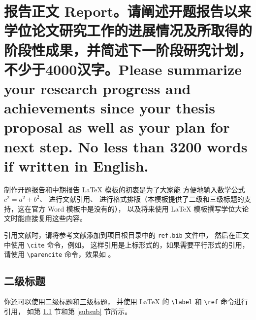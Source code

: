 \documentclass[a4paper,zihao=-4,AutoFakeBold]{ctexart}
\begin{document}
\kaishu
\linespread{1.75}\selectfont

\makeatletter
{}
\makeatother




\section{报告正文 Report。\mdseries 请阐述开题报告以来学位论文研究工作的进展情况及所取得的阶段性成果，并简述下一阶段研究计划，不少于4000汉字。Please summarize your research progress and achievements since your thesis proposal as well as your plan for next step. No less than 3200 words if written in English.}

制作开题报告和中期报告 \LaTeX{} 模板的初衷是为了大家能
方便地输入数学公式 $c^2 = a^2 + b^2$、
进行文献引用\cite{ZJSD}、
进行格式排版（本模板提供了二级和三级标题的支持，这在官方 Word 模板中是没有的），
以及将来使用 \LaTeX{} 模板撰写学位大论文时能直接复用这些内容。


引用文献时，请将参考文献添加到项目根目录中的 \texttt{ref.bib} 文件中，
然后在正文中使用 \verb|\cite| 命令，例如\cite{SPDZ}。
这样引用是上标形式的，如果需要平行形式的引用，请使用
\verb|\parencite| 命令，效果如 \parencite{SPDZ}。


\subsection{二级标题}\label{sub}

你还可以使用二级标题和三级标题，
并使用 \LaTeX{} 的 \verb|\label| 和 \verb|\ref| 命令进行引用，
如第 \ref{sub} 节和第 \ref{subsub} 节所示。
\end{document}
